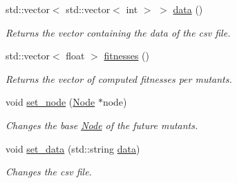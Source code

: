 \begin{DoxyCompactItemize}
\mbox{\label{classEvolution_afb925477cdd6c8703304a037208e64e1}} 
std\+::vector$<$ std\+::vector$<$ int $>$ $>$ \hyperlink{classEvolution_afb925477cdd6c8703304a037208e64e1}{data} ()
\begin{DoxyCompactList}\small\item\em Returns the vector containing the data of the csv file. \end{DoxyCompactList}\item 
\mbox{\label{classEvolution_a81a8234ea0ed97fe84f4cf6a80f37f44}} 
std\+::vector$<$ float $>$ \hyperlink{classEvolution_a81a8234ea0ed97fe84f4cf6a80f37f44}{fitnesses} ()
\begin{DoxyCompactList}\small\item\em Returns the vector of computed fitnesses per mutants. \end{DoxyCompactList}\item 
\mbox{\label{classEvolution_acd01c2f27d399ccece49258e0a29ba0b}} 
void \hyperlink{classEvolution_acd01c2f27d399ccece49258e0a29ba0b}{set\+\_\+node} (\hyperlink{classNode}{Node} $\ast$node)
\begin{DoxyCompactList}\small\item\em Changes the base \hyperlink{classNode}{Node} of the future mutants. \end{DoxyCompactList}\item 
\mbox{\label{classEvolution_ac5e3ce959ccf663c17e2930ea508e6a5}} 
void \hyperlink{classEvolution_ac5e3ce959ccf663c17e2930ea508e6a5}{set\+\_\+data} (std\+::string \hyperlink{classEvolution_afb925477cdd6c8703304a037208e64e1}{data})
\begin{DoxyCompactList}\small\item\em Changes the csv file. \end{DoxyCompactList}\end{DoxyCompactItemize}

